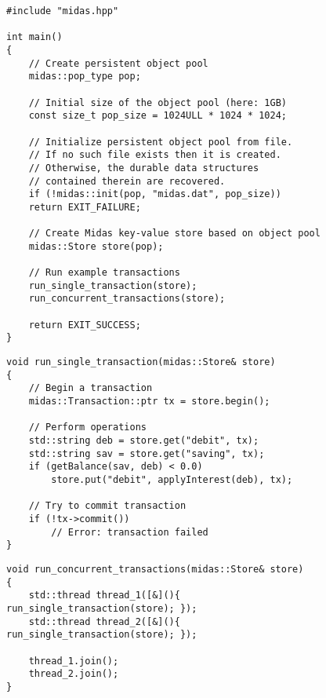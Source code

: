 \begin{figure}[h!]
\begin{lstlisting}
#include "midas.hpp"

int main()
{
    // Create persistent object pool
    midas::pop_type pop;

    // Initial size of the object pool (here: 1GB)
    const size_t pop_size = 1024ULL * 1024 * 1024;

    // Initialize persistent object pool from file.
    // If no such file exists then it is created.
    // Otherwise, the durable data structures
    // contained therein are recovered.
    if (!midas::init(pop, "midas.dat", pop_size))
    return EXIT_FAILURE;

    // Create Midas key-value store based on object pool
    midas::Store store(pop);

    // Run example transactions
    run_single_transaction(store);
    run_concurrent_transactions(store);

    return EXIT_SUCCESS;
}
\end{lstlisting}
\caption{}
\label{lst:usage-example-lifetime}
\end{figure}

\begin{figure}[h!]
\begin{lstlisting}
void run_single_transaction(midas::Store& store)
{
    // Begin a transaction
    midas::Transaction::ptr tx = store.begin();

    // Perform operations
    std::string deb = store.get("debit", tx);
    std::string sav = store.get("saving", tx);
    if (getBalance(sav, deb) < 0.0)
        store.put("debit", applyInterest(deb), tx);

    // Try to commit transaction
    if (!tx->commit())
        // Error: transaction failed
}
\end{lstlisting}
\caption{}
\label{lst:usage-single-transaction}
\end{figure}

\begin{figure}[h!]
\begin{lstlisting}
void run_concurrent_transactions(midas::Store& store)
{
    std::thread thread_1([&](){ run_single_transaction(store); });
    std::thread thread_2([&](){ run_single_transaction(store); });

    thread_1.join();
    thread_2.join();
}
\end{lstlisting}
\caption{}
\label{lst:usage-concurrent-transactions}
\end{figure}
